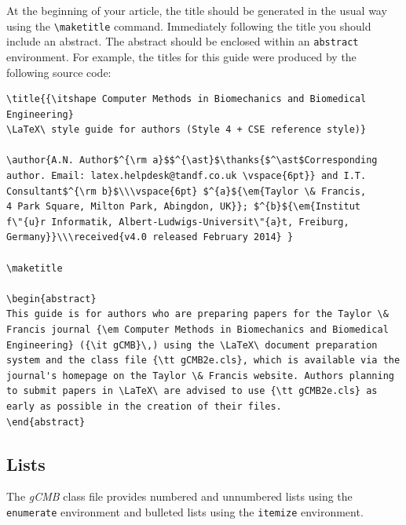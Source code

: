\documentclass{gCMB2e}
\begin{document}
At the beginning of your article, the title should be generated in the usual way using the {\verb"\maketitle"}
command. Immediately following the title you should include an abstract. The abstract should be enclosed within
an {\tt abstract} environment. For example, the titles for this guide were produced by the following source code:
%
\begin{verbatim}
\title{{\itshape Computer Methods in Biomechanics and Biomedical Engineering}
\LaTeX\ style guide for authors (Style 4 + CSE reference style)}

\author{A.N. Author$^{\rm a}$$^{\ast}$\thanks{$^\ast$Corresponding
author. Email: latex.helpdesk@tandf.co.uk \vspace{6pt}} and I.T.
Consultant$^{\rm b}$\\\vspace{6pt} $^{a}${\em{Taylor \& Francis,
4 Park Square, Milton Park, Abingdon, UK}}; $^{b}${\em{Institut
f\"{u}r Informatik, Albert-Ludwigs-Universit\"{a}t, Freiburg,
Germany}}\\\received{v4.0 released February 2014} }

\maketitle

\begin{abstract}
This guide is for authors who are preparing papers for the Taylor \&
Francis journal {\em Computer Methods in Biomechanics and Biomedical
Engineering} ({\it gCMB}\,) using the \LaTeX\ document preparation
system and the class file {\tt gCMB2e.cls}, which is available via the
journal's homepage on the Taylor \& Francis website. Authors planning
to submit papers in \LaTeX\ are advised to use {\tt gCMB2e.cls} as
early as possible in the creation of their files.
\end{abstract}
\end{verbatim}


\subsection{Lists}

The {\it gCMB} class file provides numbered and unnumbered lists using the {\tt enumerate} environment and bulleted
lists  using the {\tt itemize} environment.
\end{document}
